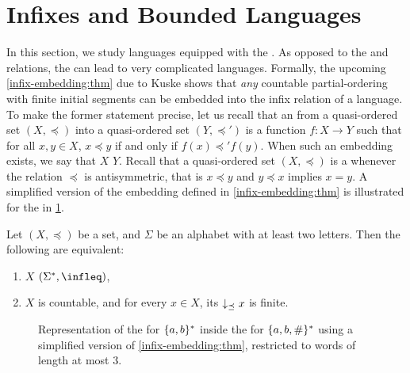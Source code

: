 \section{Infixes and Bounded Languages}
\label{infixes-bounded:sec}

\AP In this section, we study languages equipped with the .
As opposed to the  and  relations, the  can lead to very complicated  languages.
Formally, the upcoming \cref{infix-embedding:thm} due to Kuske shows that
\emph{any} countable partial-ordering with finite initial segments can be
embedded into the infix relation of a language. To make the former statement
precise, let us recall that an  from a quasi-ordered set
$(X, \preceq)$ into a quasi-ordered set $(Y, \preceq')$ is a function $f \colon
X \to Y$ such that for all $x, y \in X$, $x \preceq y$ if and only if $f(x)
\preceq' f(y)$. When such an embedding exists, we say that $X$  $Y$. Recall that a quasi-ordered set $(X, \preceq)$ is a  whenever the relation $\preceq$ is antisymmetric, that is $x \preceq
y$ and $y \preceq x$ implies $x = y$. 
A simplified version of the embedding defined in \cref{infix-embedding:thm} is illustrated
for the  in \cref{infix-embedding:fig}.
\begin{lemma}{\cite[Lemma 5.1]{DBLP:journals/ita/Kuske06}}
    \label{infix-embedding:thm}
    Let $(X, \preceq)$ be a  set,
    and $\Sigma$ be an alphabet with at least two letters.
    Then the following are equivalent:
    \begin{enumerate}
        \item 
            $X$  $(\Sigma^*, \infleq)$,
        \item 
            $X$ is countable, and for every $x \in X$,
            its 
            $\dwset[\preceq]{x}$ is finite.
    \end{enumerate}
\end{lemma}
\begin{figure}
    \centering
    
    \caption{Representation of the  for $\{ a,b \}^*$
        inside the  for $\{ a,b,\# \}^*$
        using a simplified version of \cref{infix-embedding:thm}, restricted to words
        of length at most $3$. 
    }
    \label{infix-embedding:fig}
\end{figure}


